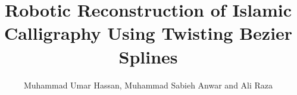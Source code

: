 \documentclass[12pt,onecolumn,aps,prb,preprint]{revtex4}   %
\begin{document}
\title{Robotic Reconstruction of Islamic Calligraphy Using Twisting Bezier Splines}
\author{Muhammad Umar Hassan, Muhammad Sabieh Anwar and Ali Raza}
%

\maketitle
\tableofcontents




%

\end{document}

